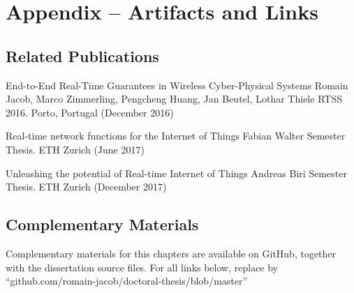 \section{Appendix -- Artifacts and Links}
\label{append:drp_artifacts}


\subsection{Related Publications}

\inlineRef%
{End-to-End Real-Time Guarantees in Wireless Cyber-Physical Systems}%
{Romain Jacob, Marco Zimmerling, Pengcheng Huang, Jan Beutel, Lothar Thiele}%
{RTSS 2016. Porto, Portugal (December 2016)}


\inlineRef%
{Real-time network functions for the Internet of Things}%
{Fabian Walter}%
{Semester Thesis. ETH Zurich (June 2017)}



\inlineRef%
{Unleashing the potential of Real-time Internet of Things}%
{Andreas Biri}%
{Semester Thesis. ETH Zurich (December 2017)}





\subsection{Complementary Materials}
Complementary materials for this chapters are available on GitHub, together with the dissertation source files. For all links below, replace \linkroot  by ``{github.com/romain-jacob/doctoral-thesis/blob/master}''



